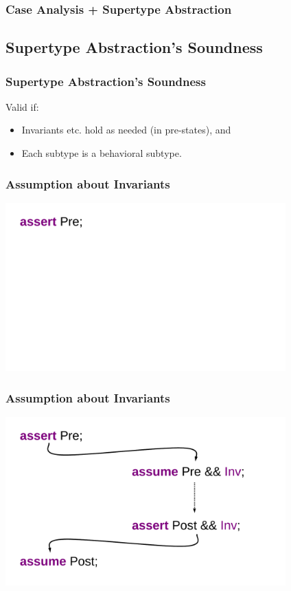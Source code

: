 \begin{frame}[fragile]
\frametitle{Case Analysis + Supertype Abstraction}

\end{frame}

\subsection[Validity]{Supertype Abstraction's Soundness}

\begin{frame}
\frametitle{Supertype Abstraction's Soundness}
Valid if:
\begin{itemize}
\item
Invariants etc. hold as needed (in pre-states), and

\item
Each subtype is a behavioral subtype.
\end{itemize}
\end{frame}

\begin{frame}
\frametitle{Assumption about Invariants}
\includegraphics[width=4.25in]{invariant-call1}
\end{frame}

\begin{frame}
\frametitle{Assumption about Invariants}
\transwipe[direction=270]
\includegraphics[width=4.25in]{invariant-call2}
\end{frame}

